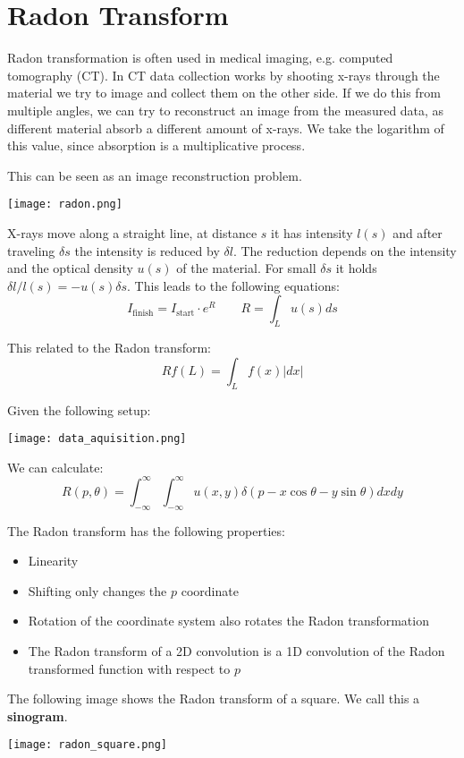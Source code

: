 \section{Radon Transform}

Radon transformation is often used in medical imaging, e.g. computed tomography (CT). In CT data collection works by shooting x-rays through the material we try to image and collect them on the other side. If we do this from multiple angles, we can try to reconstruct an image from the measured data, as different material absorb a different amount of x-rays. We take the logarithm of this value, since absorption is a multiplicative process. \medskip

This can be seen as an image reconstruction problem.
\begin{center}
	\texttt{[image: radon.png]}
\end{center}

X-rays move along a straight line, at distance $s$ it has intensity $l(s)$ and after traveling $\delta s$ the intensity is reduced by $\delta l$. The reduction depends on the intensity and the optical density $u(s)$ of the material. For small $\delta s$ it holds $\delta l / l(s) = -u(s) \delta s$. This leads to the following equations:
$$I_{\text{finish}} = I_{\text{start}} \cdot e^R \qquad R = \int_L u(s)ds$$

This related to the Radon transform:
$$Rf(L) = \int_L f(x) |dx|$$

Given the following setup:
\begin{center}
	\texttt{[image: data\_aquisition.png]}
\end{center}

We can calculate:
$$R(p, \theta) = \int_{-\infty}^\infty \int_{-\infty}^\infty u(x,y) \delta(p - x \cos \theta - y \sin \theta) dx dy$$

The Radon transform has the following properties:
\begin{itemize}
	\item Linearity
	\item Shifting only changes the $p$ coordinate
	\item Rotation of the coordinate system also rotates the Radon transformation
	\item The Radon transform of a 2D convolution is a 1D convolution of the Radon transformed function with respect to $p$
\end{itemize}

The following image shows the Radon transform of a square. We call this a \textbf{sinogram}.
\begin{center}
	\texttt{[image: radon\_square.png]}
\end{center}



